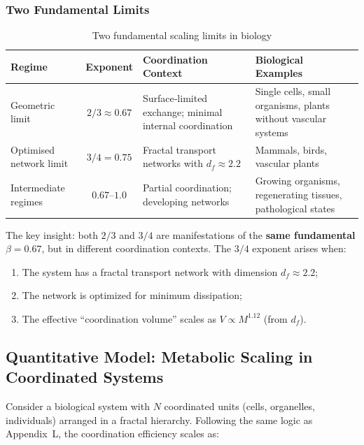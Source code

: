 \documentclass[12pt]{article}
\begin{document}
	\subsubsection{Two Fundamental Limits}
	
	\begin{table}[htbp]
		\centering
		\caption{Two fundamental scaling limits in biology}
		\label{tab:scaling-limits}
		\begin{tabular}{p{3.5cm}c p{6cm} p{5cm}}
			\toprule
			\textbf{Regime} & \textbf{Exponent} & \textbf{Coordination Context} & \textbf{Biological Examples} \\
			\midrule
			Geometric limit & \(2/3 \approx 0.67\) & Surface‑limited exchange; minimal internal coordination & Single cells, small organisms, plants without vascular systems \cite{Glazier2005,Reich2006} \\
			Optimised network limit & \(3/4 = 0.75\) & Fractal transport networks with \(d_f \approx 2.2\) & Mammals, birds, vascular plants \cite{West1997} \\
			Intermediate regimes & \(0.67\)–\(1.0\) & Partial coordination; developing networks & Growing organisms, regenerating tissues, pathological states \cite{Glazier2005} \\
			\bottomrule
		\end{tabular}
	\end{table}
	
	The key insight: both \(2/3\) and \(3/4\) are manifestations of the \textbf{same fundamental \(\beta = 0.67\)}, but in different coordination contexts. The \(3/4\) exponent arises when:
	\begin{enumerate}
		\item The system has a fractal transport network with dimension \(d_f \approx 2.2\);
		\item The network is optimized for minimum dissipation;
		\item The effective ``coordination volume'' scales as \(V \propto M^{1.12}\) (from \(d_f\)).
	\end{enumerate}
	
	\subsection{Quantitative Model: Metabolic Scaling in Coordinated Systems}
	
	Consider a biological system with \(N\) coordinated units (cells, organelles, individuals) arranged in a fractal hierarchy. Following the same logic as Appendix~L, the coordination efficiency scales as:
	
\end{document}
